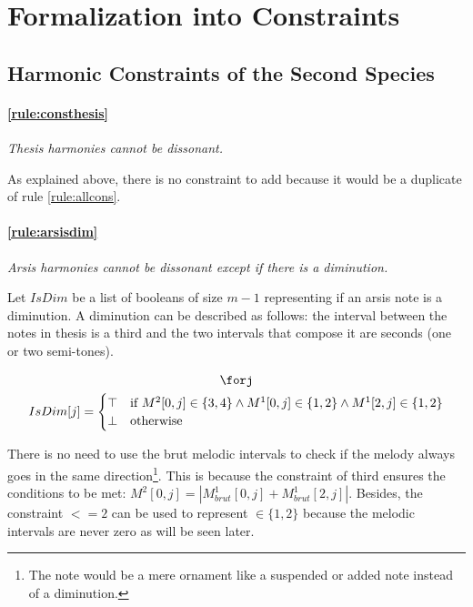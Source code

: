 \section{Formalization into Constraints}
\subsection{Harmonic Constraints of the Second Species}

\paragraph{\ref{rule:consthesis}} \textit{Thesis harmonies cannot be dissonant.}

As explained above, there is no constraint to add because it would be a duplicate of rule \ref{rule:allcons}.

\paragraph{\ref{rule:arsisdim}} \textit{Arsis harmonies cannot be dissonant except if there is a diminution.}

Let $IsDim$ be a list of booleans of size $m-1$ representing if an arsis note is a diminution. A diminution can be described as follows: the interval between the notes in thesis is a third and the two intervals that compose it are seconds (one or two semi-tones).

\begin{equation}
    \begin{gathered}
        \forj\\
        IsDim[j] = \begin{cases}
            \top & \text{if } M^2[0, j] \in \{3, 4\} \land M^1[0, j] \in \{1, 2\} \land M^1[2, j] \in \{1, 2\}\\
            \bot & \text{otherwise}
        \end{cases}
    \end{gathered}
\end{equation}

There is no need to use the brut melodic intervals to check if the melody always goes in the same direction\footnote{The note would be a mere ornament like a suspended or added note instead of a diminution.}. This is because the constraint of third ensures the conditions to be met: $M^2[0, j] = \left|M^1_{brut}[0, j] + M^1_{brut}[2, j]\right|$. Besides, the constraint $<= 2$ can be used to represent $\in \{1, 2\}$ because the melodic intervals are never zero as will be seen later.

